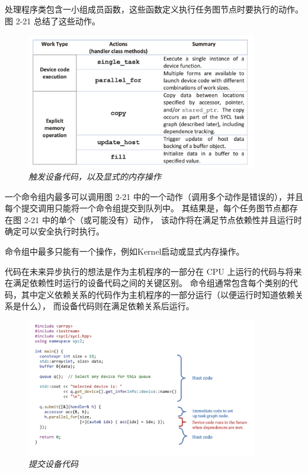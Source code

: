 处理程序类包含一小组成员函数，这些函数定义执行任务图节点时要执行的动作。 图 2-21 总结了这些动作。

\begin{figure}[H]
	\centering
	\includegraphics[width=0.9\textwidth]{figs/F2.21.png}
	\caption{\textit{触发设备代码，以及显式的内存操作}}
\end{figure}

一个命令组内最多可以调用图 2-21 中的一个动作（调用多个动作是错误的），并且每个提交调用只能将一个命令组提交到队列中。 
其结果是，每个任务图节点都存在图 2-21 中的单个（或可能没有）动作，
该动作将在满足节点依赖性并且运行时确定可以安全执行时执行。

\begin{remark}
命令组中最多只能有一个操作，例如Kernel启动或显式内存操作。
\end{remark}

代码在未来异步执行的想法是作为主机程序的一部分在 CPU 上运行的代码与将来在满足依赖性时运行的设备代码之间的关键区别。 
命令组通常包含每个类别的代码，其中定义依赖关系的代码作为主机程序的一部分运行（以便运行时知道依赖关系是什么），
而设备代码则在满足依赖关系后运行。

\begin{figure}[H]
	\centering
	\includegraphics[width=0.9\textwidth]{figs/F2.22.png}
	\caption{\textit{提交设备代码}}
\end{figure}

